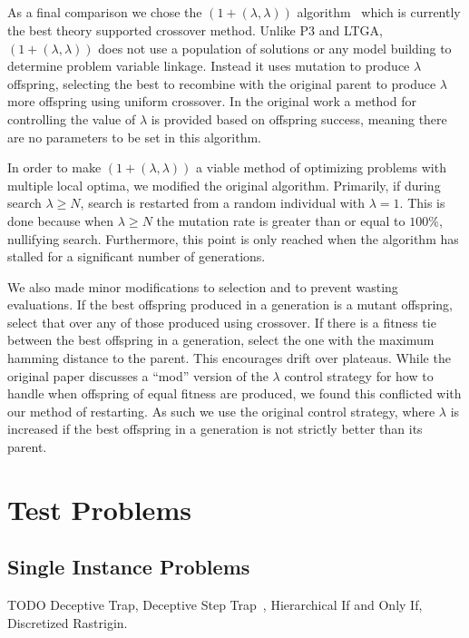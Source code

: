 \documentclass{sig-alternate}
\begin{document}
\subsection{}
As a final comparison we chose the $(1+(\lambda,\lambda))$ algorithm~\cite{doerr:2013:lambdalambda}
which is currently the best theory supported crossover method.  Unlike P3 and LTGA,
$(1+(\lambda,\lambda))$ does not use a population of solutions or any model building
to determine problem variable linkage.  Instead it uses mutation to produce $\lambda$
offspring, selecting the best to recombine with the original parent to produce $\lambda$
more offspring using uniform crossover.  In the original work a method for controlling
the value of $\lambda$ is provided based on offspring success, meaning there are no
parameters to be set in this algorithm.

In order to make $(1+(\lambda,\lambda))$ a viable method of optimizing problems
with multiple local optima, we modified the original algorithm.  Primarily, if
during search $\lambda \ge N$, search is restarted from a random individual with
$\lambda=1$.  This is done because when $\lambda \ge N$ the mutation rate is greater
than or equal to $100\%$, nullifying search.  Furthermore, this point is only reached
when the algorithm has stalled for a significant number of generations.

We also made minor modifications to selection and to prevent wasting evaluations.
If the best offspring produced in a generation is a mutant offspring, select that
over any of those produced using crossover.  If there is a fitness tie between the
best offspring in a generation, select the one with the maximum hamming distance
to the parent.  This encourages drift over plateaus.  While the original paper
discusses a ``mod'' version of the $\lambda$ control strategy for how to handle
when offspring of equal fitness are produced, we found this conflicted with our
method of restarting.  As such we use the original control strategy, where $\lambda$
is increased if the best offspring in a generation is not strictly better than its parent.

\section{Test Problems}

\subsection{Single Instance Problems}
TODO Deceptive Trap, Deceptive Step Trap~\cite{goldman:2012:ltga}, Hierarchical If
and Only If, Discretized Rastrigin.
\end{document}
